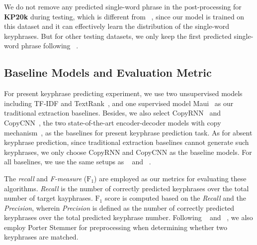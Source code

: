 \documentclass[letterpaper]{article} %
\begin{document}
We do not remove any predicted single-word phrase in the post-processing for \textbf{KP20k} during testing, which is different from \citeauthor{meng2017dkg}~, since our model is trained on this dataset and it can effectively learn the distribution of the single-word keyphrases. But for other testing datasets, we only keep the first predicted single-word phrase following \citeauthor{meng2017dkg}~.


\subsection{Baseline Models and Evaluation Metric}
For present keyphrase predicting experiment, we use two unsupervised models including TF-IDF and TextRank~\cite{mihalcea2004textrank}, and one supervised model Maui~\cite{medelyan2009human} as our traditional extraction baselines.
Besides, we also select CopyRNN~\cite{meng2017dkg} and CopyCNN~\cite{zhang2017dkg_conv}, the two state-of-the-art encoder-decoder models with copy mechanism~\cite{gu2016incorporating_copy}, as the baselines for present keyphrase prediction task. As for absent keyphrase prediction, since traditional extraction baselines cannot generate such keyphrases, we only choose CopyRNN and CopyCNN as the baseline models. For all baselines, we use the same setups as \citeauthor{meng2017dkg}~ and  \citeauthor{zhang2017dkg_conv}~.
%

The \textit{recall} and \textit{F-measure} ($\text{F}_1$) are employed as our metrics for evaluating these algorithms. \textit{Recall} is the number of correctly predicted keyphrases over the total number of target kayphrases. $\text{F}_1$ score is computed based on the \textit{Recall} and  the \textit{Precision}, wherein \textit{Precision} is defined as the number of correctly predicted keyphrases over the total predicted keyphrase number. Following \citeauthor{meng2017dkg}~ and \citeauthor{zhang2017dkg_conv}~, we also employ Porter Stemmer for preprocessing when determining whether two keyphrases are matched.
\end{document}
